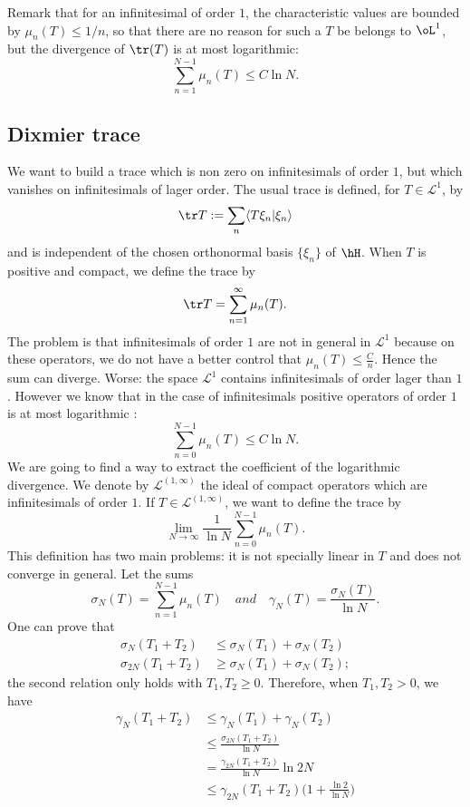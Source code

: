 Remark that for an infinitesimal of order $1$, the characteristic values are bounded by $\mu_n(T)\leq 1/n$, so that there are no reason for such a $T$ be belongs to $\oL^1$, but the divergence of $\tr(T)$ is at most logarithmic:
\[ 
  \sum_{n=1}^{N-1}\mu_n(T)\leq C\ln N.
\]

\subsection{Dixmier trace}

We want to build a trace which is non zero on infinitesimals of order $1$, but which vanishes on infinitesimals of lager order. The usual trace is defined, for $T\in\mathscr{L}^{1}$,  by
\[ 
  \tr T:=\sum_n\langle T\xi_n|\xi_n\rangle
\]
and is independent of the chosen orthonormal basis $\{ \xi_n \}$ of $\hH$. When $T$ is positive and compact, we define the trace by
\[ 
  \tr T=\sum_{n=1}^{\infty}\mu_n(T).
\]
The problem is that infinitesimals of order $1$ are not in general in $\mathscr{L}^{1}$ because on these operators, we do not have a better control that $\mu_n(T)\leq \frac{ C }{ n }$. Hence the sum can diverge. Worse: the space $\mathscr{L}^{1}$ contains infinitesimals of order lager than $1$. However we know that in the case of infinitesimals positive operators of order $1$ is at most logarithmic :
\[ 
  \sum_{n=0}^{N-1}\mu_n(T)\leq C\ln N.
\]
We are going to find a way to extract the coefficient of the logarithmic divergence. We denote by $\mathscr{L}^{(1,\infty)}$ the ideal of compact operators which are infinitesimals of order $1$. If $T\in\mathscr{L}^{(1,\infty)}$, we want to define the trace by
\[ 
  \lim_{N\to\infty}\frac{1}{ \ln N }\sum_{n=0}^{N-1}\mu_n(T).
\]
This definition has two main problems: it is not specially linear in $T$ and does not converge in general. Let the sums
\[ 
  \sigma_N(T)=\sum_{n=1}^{N-1}\mu_n(T)\quad{ and }\quad\gamma_N(T)=\frac{ \sigma_N(T) }{ \ln N }.
\]
One can prove that 
\begin{subequations}
\begin{align}
\sigma_N(T_1+T_2)&\leq\sigma_N(T_1)+\sigma_N(T_2)\\
\sigma_{2N}(T_1+T_2)&\geq\sigma_N(T_1)+\sigma_N(T_2);
\end{align}
\end{subequations}
the second relation only holds with $T_1,T_2\geq0$. Therefore, when $T_1,T_2>0$, we have
\begin{equation} \label{eq_gammaNleq}
\begin{split}
  \gamma_N(T_1+T_2)&\leq \gamma_N(T_1)+\gamma_N(T_2)\\
		&\leq \frac{ \sigma_{2N}(T_1+T_2) }{ \ln N }\\
		&=\frac{ \gamma_{2N}(T_1+T_2) }{ \ln N }\ln 2N\\
		&\leq \gamma_{2N}(T_1+T_2)\big( 1+\frac{ \ln 2 }{ \ln N } \big)
\end{split}
\end{equation}
